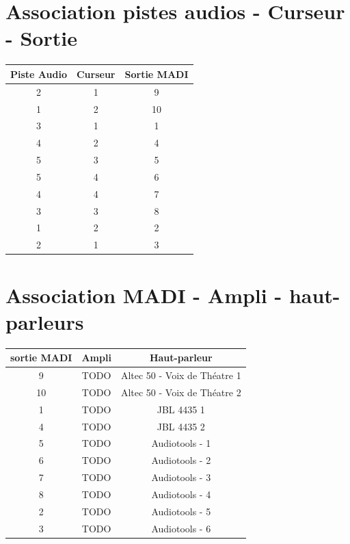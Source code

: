 \documentclass[12pt,a4paper]{report}
\begin{document}
 \chapter*{Association pistes audios - Curseur - Sortie}
 \begin{center}
 \begin{tabular}{|c|c|c|}
 \hline 
 Piste Audio & Curseur & Sortie MADI \\ 
\hline 
2 & 1 & 9 \\ 
 \hline 
1 & 2 & 10 \\ 
 \hline 
3 & 1 & 1 \\ 
 \hline 
4 & 2 & 4 \\ 
 \hline 
5 & 3 & 5 \\ 
 \hline 
5 & 4 & 6 \\ 
 \hline 
4 & 4 & 7 \\ 
 \hline 
3 & 3 & 8 \\ 
 \hline 
1 & 2 & 2 \\ 
 \hline 
2 & 1 & 3 \\ 
 \hline 

 \end{tabular}  

 \end{center}
 \chapter*{Association MADI - Ampli - haut-parleurs}
 \begin{center}
 \begin{tabular}{|c|c|c|}
 \hline 
 sortie MADI & Ampli & Haut-parleur \\ 
\hline 
9 & TODO & Altec 50 - Voix de Théatre 1 \\ 
 \hline 
10 & TODO & Altec 50 - Voix de Théatre 2 \\ 
 \hline 
1 & TODO & JBL 4435 1 \\ 
 \hline 
4 & TODO & JBL 4435 2 \\ 
 \hline 
5 & TODO & Audiotools - 1 \\ 
 \hline 
6 & TODO & Audiotools - 2 \\ 
 \hline 
7 & TODO & Audiotools - 3 \\ 
 \hline 
8 & TODO & Audiotools - 4 \\ 
 \hline 
2 & TODO & Audiotools - 5 \\ 
 \hline 
3 & TODO & Audiotools - 6 \\ 
 \hline 

 \end{tabular}  

 \end{center}
 
\end{document}
